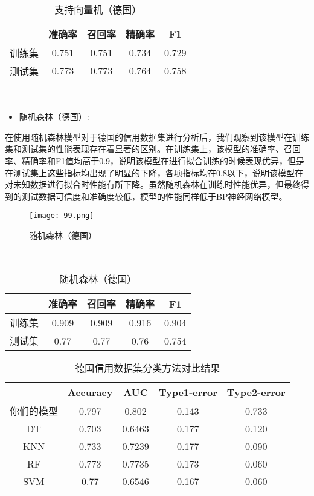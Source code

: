 \documentclass[12pt,a4paper]{nmmcm}
\begin{document}
\\\begin{table}[H]
\centering
 \caption{支持向量机（德国）}
\begin{tabular}{ccccc}
\hline
 & 准确率   & 召回率   & 精确率   & F1    \\
\hline
训练集   & 0.751 &0.751& 0.734& 0.729\\
测试集   & 0.773& 0.773 & 0.764 & 0.758  \\
\hline
\end{tabular}
\end{table}
\\
\begin{itemize}
   \item
随机森林（德国）:
\end{itemize}
在使用随机森林模型对于德国的信用数据集进行分析后，我们观察到该模型在训练集和测试集的性能表现存在着显著的区别。在训练集上，该模型的准确率、召回率、精确率和F1值均高于0.9，说明该模型在进行拟合训练的时候表现优异，但是在测试集上这些指标均出现了明显的下降，各项指标均在0.8以下，说明该模型在对未知数据进行拟合时性能有所下降。虽然随机森林在训练时性能优异，但最终得到的测试数据可信度和准确度较低，模型的性能同样低于BP神经网络模型。
\\
\begin{figure}
    \centering
      
    \texttt{[image: 99.png]}
    \label{fig:enter-label}
      \caption{随机森林（德国）}
\end{figure}
\\\begin{table}[H]
\centering
 \caption{随机森林（德国）}
\begin{tabular}{ccccc}
\hline
 & 准确率   & 召回率   & 精确率   & F1    \\
\hline
训练集   & 0.909 &0.909& 0.916& 0.904\\
测试集   & 0.77& 0.77 & 0.76 & 0.754  \\
\hline
\end{tabular}
\end{table}


\begin{table}[H]
\centering
 \caption{德国信用数据集分类方法对比结果}
\begin{tabular}{ccccc}

\hline
      & Accuracy & AUC & Type1-error & Type2-error \\
      \hline
你们的模型 &    0.797 &       0.802& 0.143       & 0.733        \\
DT    &       0.703&           0.6463& 0.177      & 0.120        \\
KNN   &       0.733&     0.7239& 0.177        & 0.090            \\
RF    &       0.773&     0.7735& 0.173       &0.060             \\
SVM   &       0.77&     0.6546&  0.167       &0.060            \\
\hline
\end{tabular}
    \label{fig:enter-label}
\end{table}	
\end{document}
